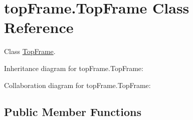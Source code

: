 \hypertarget{classtop_frame_1_1_top_frame}{\section{top\-Frame.\-Top\-Frame Class Reference}
\label{classtop_frame_1_1_top_frame}
}


Class \hyperlink{classtop_frame_1_1_top_frame}{Top\-Frame}.  




Inheritance diagram for top\-Frame.\-Top\-Frame\-:


Collaboration diagram for top\-Frame.\-Top\-Frame\-:
\subsection*{Public Member Functions}
